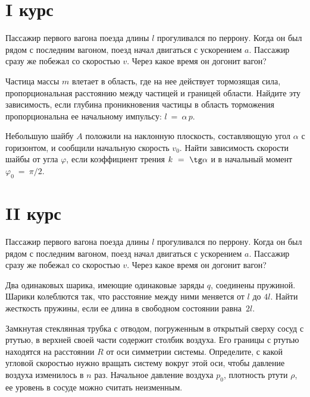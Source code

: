 \section{I курс}

\AddProb Пассажир первого вагона поезда длины $l$ прогуливался по перрону. Когда он был рядом с последним вагоном, поезд начал двигаться с ускорением $a$. 
Пассажир сразу же побежал со скоростью $v$. Через какое время он догонит вагон?

\AddProb Частица массы $m$ влетает в область, где на нее действует тормозящая сила, пропорциональная расстоянию между частицей и границей области. 
Найдите эту зависимость, если глубина проникновения частицы в область торможения пропорциональна ее начальному импульсу: $l~=~\alpha\,p$.

\AddProb Небольшую шайбу $A$ положили на наклонную плоскость, составляющую угол $\alpha$ с горизонтом, и сообщили начальную скорость $v_0$. 
Найти зависимость скорости шайбы от угла $\varphi$, если коэффициент трения $k~=~ \tg \alpha$ и в начальный момент $\varphi_0~=~\pi/2$.


\section{II курс}

\AddProb Пассажир первого вагона поезда длины $l$ прогуливался по перрону. Когда он был рядом с последним вагоном, поезд начал двигаться с ускорением $a$. 
Пассажир сразу же побежал со скоростью $v$. Через какое время он догонит вагон?

\AddProb Два одинаковых шарика, имеющие одинаковые заряды $q$, соединены пружиной. Шарики колеблются так, 
что расстояние между ними меняется от $l$ до $4l$. Найти жесткость пружины, если ее длина в свободном состоянии равна~$2l$.

\AddProb Замкнутая стеклянная трубка с отводом, погруженным в открытый сверху сосуд с ртутью, в верхней своей части содержит столбик воздуха. 
Его границы с ртутью находятся на расстоянии $R$ от оси симметрии системы. Определите, с какой угловой скоростью нужно вращать систему вокруг этой оси, 
чтобы давление воздуха изменилось в $n$ раз. Начальное давление воздуха $p_0$, плотность ртути $\rho$, ее уровень в сосуде можно считать неизменным.